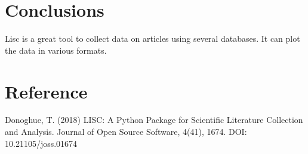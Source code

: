 \documentclass[12pt, letterpaper]{article}
\begin{document}
\section{Conclusions}

Lisc is a great tool to collect data on articles using several databases. It can plot the data in various formats.

\section{Reference}

Donoghue, T. (2018) LISC: A Python Package for Scientific Literature Collection and Analysis. Journal of Open Source Software, 4(41), 1674. DOI: 10.21105/joss.01674
\end{document}
